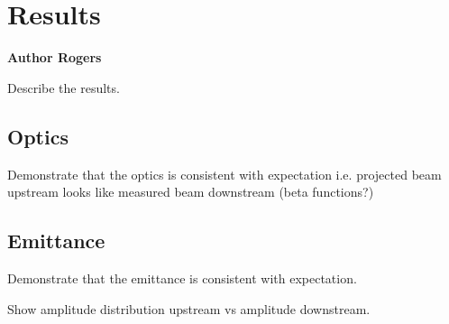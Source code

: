 \section{Results}

\bf{Author Rogers}

Describe the results.

\subsection{Optics}

Demonstrate that the optics is consistent with expectation i.e. projected beam
upstream looks like measured beam downstream (beta functions?)

\subsection{Emittance}

Demonstrate that the emittance is consistent with expectation.

Show amplitude distribution upstream vs amplitude downstream.


